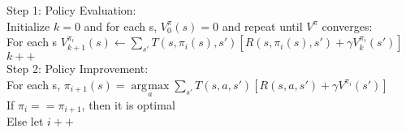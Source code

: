 \documentclass[11pt, a4paper]{article}
\DeclareMathOperator*{\argmax}{\arg\!\max}
\begin{document}
\begin{multicols*}{1}
            \hspace*{10 mm}Step 1: Policy Evaluation:\\
            \hspace*{15 mm}Initialize $k = 0$ and for each s, $V_0^\pi(s) = 0$ and repeat until $V^\pi$ converges:\\
            \hspace*{20 mm}For each s $V_{k + 1}^{\pi_i}(s) \gets \sum\limits_{s'} T(s, \pi_i(s), s') [R(s, \pi_i(s), s') + \gamma V_k^{\pi_i}(s')]$\\
            \hspace*{15 mm}$k++$\\
            \hspace*{10 mm}Step 2: Policy Improvement:\\
            \hspace*{15 mm}For each s, $\pi_{i + 1}(s) = \argmax\limits_{a} \sum\limits_{s'} T(s, a, s') [R(s, a, s') + \gamma V^{\pi_i}(s')]$\\
            \hspace*{15 mm}If $\pi_i == \pi_{i + 1}$, then it is optimal\\
            \hspace*{15 mm}Else let $i++$
    \end{multicols*}
\end{document}
